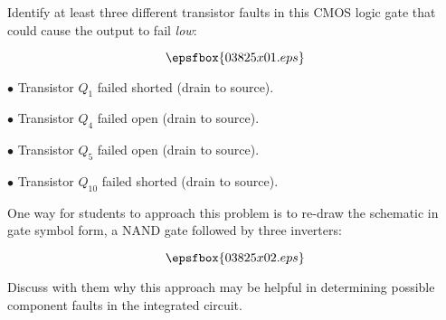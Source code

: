 

Identify at least three different transistor faults in this CMOS logic gate that could cause the output to fail {\it low}:

$$\epsfbox{03825x01.eps}$$







\medskip
\item{$\bullet$} Transistor $Q_1$ failed shorted (drain to source).
\vskip 5pt
\item{$\bullet$} Transistor $Q_4$ failed open (drain to source).
\vskip 5pt
\item{$\bullet$} Transistor $Q_5$ failed open (drain to source).
\vskip 5pt
\item{$\bullet$} Transistor $Q_{10}$ failed shorted (drain to source).
\medskip







One way for students to approach this problem is to re-draw the schematic in gate symbol form, a NAND gate followed by three inverters:

$$\epsfbox{03825x02.eps}$$

Discuss with them why this approach may be helpful in determining possible component faults in the integrated circuit.




